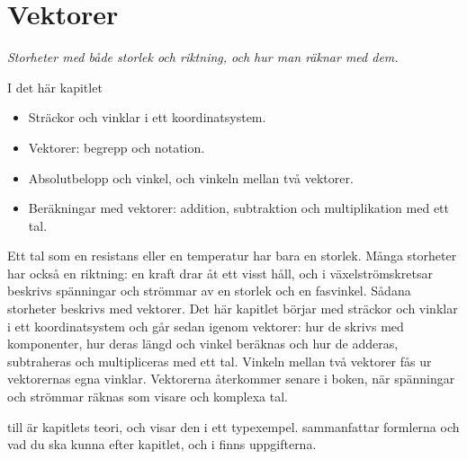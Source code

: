 
\chapter{Vektorer}
\label{c7:ch}

{\large\itshape Storheter med både storlek och riktning, och hur man räknar med dem.\par}

\begin{chapterbox}{I det här kapitlet}
\begin{itemize}
  \item Sträckor och vinklar i ett koordinatsystem.
  \item Vektorer: begrepp och notation.
  \item Absolutbelopp och vinkel, och vinkeln mellan två vektorer.
  \item Beräkningar med vektorer: addition, subtraktion och multiplikation med ett tal.
\end{itemize}
\end{chapterbox}

Ett tal som en resistans eller en temperatur har bara en storlek. Många storheter har också en
riktning: en kraft drar åt ett visst håll, och i växelströmskretsar beskrivs spänningar och
strömmar av en storlek och en fasvinkel. Sådana storheter beskrivs med vektorer. Det här kapitlet
börjar med sträckor och vinklar i ett koordinatsystem och går sedan igenom vektorer: hur de
skrivs med komponenter, hur deras längd och vinkel beräknas och hur de adderas, subtraheras och
multipliceras med ett tal. Vinkeln mellan två vektorer fås ur vektorernas egna vinklar. Vektorerna
återkommer senare i boken, när spänningar och strömmar räknas som visare och komplexa tal.

 till  är kapitlets teori, och
 visar den i ett typexempel. 
sammanfattar formlerna och vad du ska kunna efter kapitlet, och i  finns
uppgifterna.




